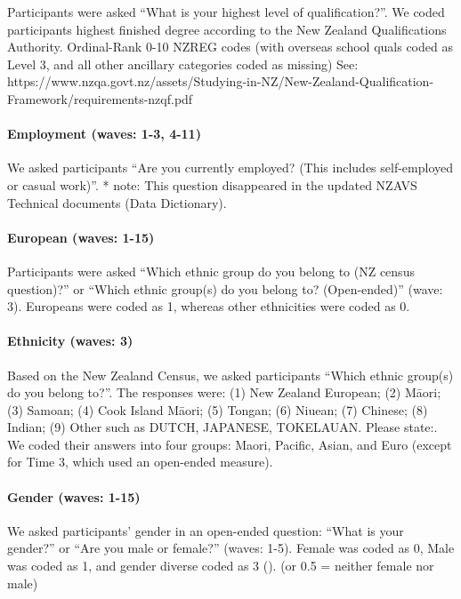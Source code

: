 \documentclass[
  singlecolumn]{article}
\let\oldparagraph\paragraph
\renewcommand{\paragraph}[1]{\oldparagraph{#1}\mbox{}}
\begin{document}
Participants were asked ``What is your highest level of
qualification?''. We coded participants highest finished degree
according to the New Zealand Qualifications Authority. Ordinal-Rank 0-10
NZREG codes (with overseas school quals coded as Level 3, and all other
ancillary categories coded as missing) See:
https://www.nzqa.govt.nz/assets/Studying-in-NZ/New-Zealand-Qualification-Framework/requirements-nzqf.pdf

\paragraph{Employment (waves: 1-3,
4-11)}\label{employment-waves-1-3-4-11}

We asked participants ``Are you currently employed? (This includes
self-employed or casual work)''. * note: This question disappeared in
the updated NZAVS Technical documents (Data Dictionary).

\paragraph{European (waves: 1-15)}\label{european-waves-1-15}

Participants were asked ``Which ethnic group do you belong to (NZ census
question)?'' or ``Which ethnic group(s) do you belong to? (Open-ended)''
(wave: 3). Europeans were coded as 1, whereas other ethnicities were
coded as 0.

\paragraph{Ethnicity (waves: 3)}\label{ethnicity-waves-3}

Based on the New Zealand Census, we asked participants ``Which ethnic
group(s) do you belong to?''. The responses were: (1) New Zealand
European; (2) Māori; (3) Samoan; (4) Cook Island Māori; (5) Tongan; (6)
Niuean; (7) Chinese; (8) Indian; (9) Other such as DUTCH, JAPANESE,
TOKELAUAN. Please state:. We coded their answers into four groups:
Maori, Pacific, Asian, and Euro (except for Time 3, which used an
open-ended measure).

\paragraph{Gender (waves: 1-15)}\label{gender-waves-1-15}

We asked participants' gender in an open-ended question: ``What is your
gender?'' or ``Are you male or female?'' (waves: 1-5). Female was coded
as 0, Male was coded as 1, and gender diverse coded as 3
(). (or 0.5
= neither female nor male)
\end{document}
